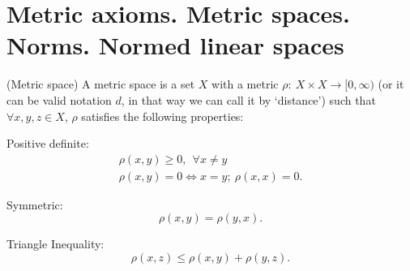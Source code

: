 \section{Metric axioms. Metric spaces. Norms. Normed linear spaces}
\vspace*{-0.5cm}

\begin{definition}{(Metric space)}{}
    A metric space is a set $X$ with a metric $\rho: \ X \times X \to [0, \infty)$ (or it can be valid notation $d$, in that way we can call it by `distance') such that $\forall x, y, z \in X$, $\rho$ satisfies the following properties:
    \begin{enumerate*}
        \item Positive definite:
        \[
            \begin{array}{c}
                \rho(x,y) \geq 0, \ \ \forall x \neq y\\
                \rho(x,y)=0\Longleftrightarrow x = y; \ \rho(x,x) = 0.
            \end{array}  
        \]
        \item Symmetric:
        \[
            \rho(x,y) = \rho(y,x).  
        \]
        \item Triangle Inequality:
        \[
            \rho(x, z) \leq \rho (x,y) + \rho(y,z).  
        \]
    \end{enumerate*}
\end{definition}
\Ex

